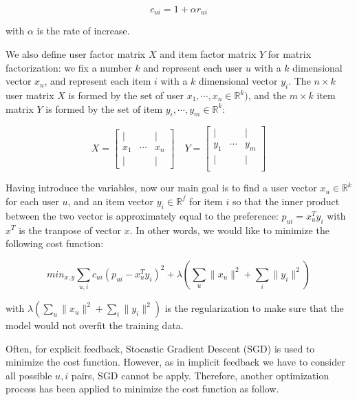 \begin{displaymath}
c_{ui} = 1 + \alpha r_{ui}
\end{displaymath}

\noindent with \( \alpha\) is the rate of increase. 

We also define user factor matrix \(X\) and item factor matrix \(Y\) for matrix factorization: we fix a number \(k\) and represent each user \(u\) with a \(k\) dimensional vector \(x_u\), and represent each item \(i\) with a \(k\) dimensional vector \(y_i\). The \(n \times k \) user matrix \(X\) is formed by the set of user \(x_1, \cdots, x_n \in \mathbb{R}^k) \), and the \(m \times k \) item matrix \(Y\) is formed by the set of item \(y_i, \cdots, y_m \in \mathbb{R}^k \):
 
\[
X = \begin{bmatrix}
| & & | \\
x_1 & \cdots & x_n \\ 
| & & | 
\end{bmatrix} \quad
Y = 
\begin{bmatrix}
| & & | \\
y_1 & \cdots & y_m \\ 
| & & | \\
\end{bmatrix}
\]

Having introduce the variables, now our main goal is to find a user vector \(x_u \in \mathbb{R}^k \) for each user \(u\), and an item vector \(y_i \in \mathbb{R}^f \) for item \(i\) so that the inner product between the two vector is approximately equal to the preference: \(p_{ui} = x^T_u y_i \) with \(x^T\) is the tranpose of vector \(x\). In other words, we would like to minimize the following cost function:

\begin{displaymath}
min_{x, y} \sum_{u,i} c_{ui} (p_{ui} - x^T_u y_i)^2 + \lambda \left(\sum_u \lVert x_u \rVert^2 + \sum_i \lVert y_i \rVert ^2 \right) \tag{1} \label{eq:1}
\end{displaymath}

with \( \lambda \left(\sum_u \lVert x_u \rVert^2 + \sum_i \lVert y_i \rVert ^2 \right)\) is the regularization to make sure that the model would not overfit the training data. 

Often, for explicit feedback, Stocastic Gradient Descent (SGD) is used to minimize the cost function. However, as in implicit feedback we have to consider all possible \(u, i\) pairs, SGD cannot be apply. Therefore, another optimization process has been applied to minimize the cost function as follow.

